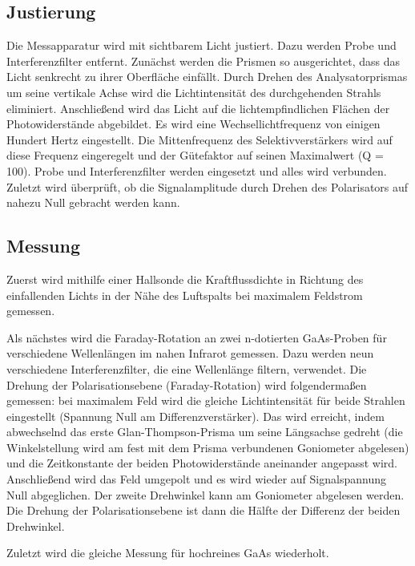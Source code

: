 \subsection{Justierung}
Die Messapparatur wird mit sichtbarem Licht justiert. Dazu werden Probe und Interferenzfilter entfernt.
Zunächst werden die Prismen so ausgerichtet, dass das Licht senkrecht zu ihrer Oberfläche einfällt. Durch Drehen des Analysatorprismas um seine vertikale Achse wird die Lichtintensität des durchgehenden Strahls eliminiert.
Anschließend wird das Licht auf die lichtempfindlichen Flächen der Photowiderstände abgebildet.
Es wird eine Wechsellichtfrequenz von einigen Hundert Hertz eingestellt. Die Mittenfrequenz des Selektivverstärkers wird auf diese Frequenz eingeregelt und der Gütefaktor auf seinen Maximalwert (Q = 100).
Probe und Interferenzfilter werden eingesetzt und alles wird verbunden. Zuletzt wird überprüft, ob die Signalamplitude durch Drehen des Polarisators auf nahezu Null gebracht werden kann.

\subsection{Messung}
Zuerst wird mithilfe einer Hallsonde die Kraftflussdichte in Richtung des einfallenden Lichts in der Nähe des Luftspalts bei maximalem Feldstrom gemessen.

Als nächstes wird die Faraday-Rotation an zwei n-dotierten GaAs-Proben für verschiedene Wellenlängen im nahen Infrarot gemessen. Dazu werden neun verschiedene Interferenzfilter, die eine Wellenlänge filtern, verwendet.
Die Drehung der Polarisationsebene (Faraday-Rotation) wird folgendermaßen gemessen: bei maximalem Feld wird die gleiche Lichtintensität für beide Strahlen eingestellt (Spannung Null am Differenzverstärker). Das wird erreicht, indem abwechselnd das erste Glan-Thompson-Prisma um seine Längsachse gedreht (die Winkelstellung wird am fest mit dem Prisma verbundenen Goniometer abgelesen) und die Zeitkonstante der beiden Photowiderstände aneinander angepasst wird. Anschließend wird das Feld umgepolt und es wird wieder auf Signalspannung Null abgeglichen. Der zweite Drehwinkel kann am Goniometer abgelesen werden. Die Drehung der Polarisationsebene ist dann die Hälfte der Differenz der beiden Drehwinkel.

Zuletzt wird die gleiche Messung für hochreines GaAs wiederholt.